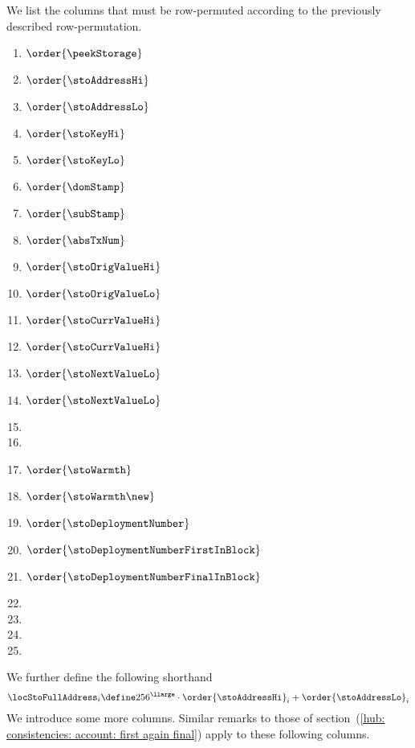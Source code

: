 We list the columns that must be row-permuted according to the previously described row-permutation.
\begin{multicols}{3}
	\begin{enumerate}
		\item $\order{\peekStorage}$
		\item $\order{\stoAddressHi}$
		\item $\order{\stoAddressLo}$
		\item $\order{\stoKeyHi}$
		\item $\order{\stoKeyLo}$
		\item $\order{\domStamp}$
		\item $\order{\subStamp}$
		\item $\order{\absTxNum}$
		\item $\order{\stoOrigValueHi}$
		\item $\order{\stoOrigValueLo}$
		\item $\order{\stoCurrValueHi}$
		\item $\order{\stoCurrValueHi}$
		\item $\order{\stoNextValueLo}$
		\item $\order{\stoNextValueLo}$
		\item[\vspace{\fill}]
		\item[\vspace{\fill}]
		\item $\order{\stoWarmth}$
		\item $\order{\stoWarmth\new}$
		\item $\order{\stoDeploymentNumber}$
		\item $\order{\stoDeploymentNumberFirstInBlock}$
		\item $\order{\stoDeploymentNumberFinalInBlock}$
		\item[\vspace{\fill}]
		\item[\vspace{\fill}]
		\item[\vspace{\fill}]
		\item[\vspace{\fill}]
	\end{enumerate}
\end{multicols}
\noindent We further define the following shorthand
\[
	\locStoFullAddress_{i}
	\define
	256^\llarge \cdot \order{\stoAddressHi}_{i} + \order{\stoAddressLo}_{i}
\]
\noindent We introduce some more columns.
Similar remarks to those of section~(\ref{hub: consistencies: account: first again final}) apply to these following columns.
